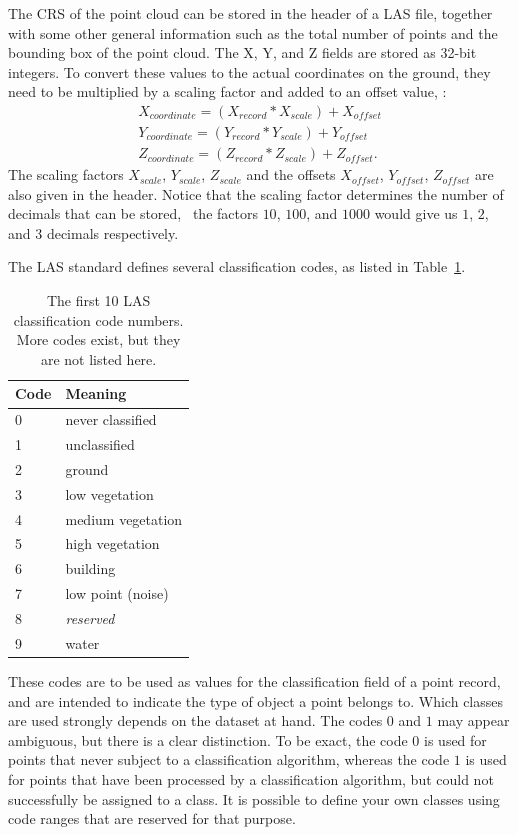 The CRS of the point cloud can be stored in the header of a LAS file, together with some other general information such as the total number of points and the bounding box of the point cloud. 
The X, Y, and Z fields are stored as 32-bit integers. 
To convert these values to the actual coordinates on the ground, they need to be multiplied by a scaling factor and added to an offset value, \ie:
\begin{gather*}
  X_{coordinate} = (X_{record} * X_{scale}) + X_{offset} \\
  Y_{coordinate} = (Y_{record} * Y_{scale}) + Y_{offset} \\
  Z_{coordinate} = (Z_{record} * Z_{scale}) + Z_{offset}.
\end{gather*}
The scaling factors $X_{scale}$, $Y_{scale}$, $Z_{scale}$ and the offsets $X_{offset}$, $Y_{offset}$, $Z_{offset}$ are also given in the header. Notice that the scaling factor determines the number of decimals that can be stored, \eg\ the factors $10$, $100$, and $1000$ would give us $1$, $2$, and $3$ decimals respectively.

The LAS standard defines several classification codes, as listed in Table~\ref{tab:las-classes}.
\begin{table}
  \centering
  \begin{tabular}{l|l}
  Code & Meaning \\ \midrule
  0 & never classified \\
  1 & unclassified \\
  2 & ground \\
  3 & low vegetation \\
  4 & medium vegetation \\
  5 & high vegetation \\
  6 & building \\
  7 & low point (noise) \\
  8 & \emph{reserved} \\
  9 & water \\
\end{tabular}
\caption{The first 10 LAS classification code numbers. More codes exist, but they are not listed here.}%
\label{tab:las-classes}
\end{table}
These codes are to be used as values for the classification field of a point record, and are intended to indicate the type of object a point belongs to.
Which classes are used strongly depends on the dataset at hand.
The codes $0$ and $1$ may appear ambiguous, but there is a clear distinction.
To be exact, the code $0$ is used for points that never subject to a classification algorithm, whereas the code $1$ is used for points that have been processed by a classification algorithm, but could not successfully be assigned to a class.
It is possible to define your own classes using code ranges that are reserved for that purpose.

